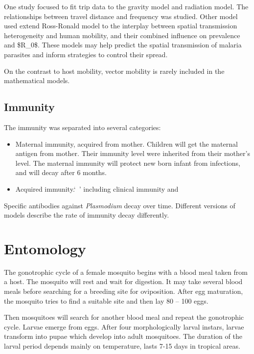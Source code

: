 \documentclass[a4paper, 12pt, twoside]{article}
\begin{document}
  One study focused to fit trip data to the gravity model and radiation model\cite{Marshall2018}.
  The relationships between travel distance and frequency was studied.
  Other model\cite{acevedo_spatial_2015} used extend Ross-Ronald model to the interplay between spatial transmission heterogeneity and human mobility, and their combined influence on prevalence and \gls{$R_0$}.
  These models may help predict the spatial transmission of malaria parasites and inform strategies to control their spread.

  On the contrast to host mobility, vector mobility is rarely included in the mathematical models.

\subsection{Immunity}

The immunity was separated into several categories:

\begin{itemize}
  \item Maternal immunity, acquired from mother. Children will get the maternal antigen from mother. Their immunity level were inherited from their mother's level. The maternal immunity will protect new born infant from infections, and will decay after 6 months.
  \item Acquired immunity.`\ ' including clinical immunity and  
\end{itemize}

Specific antibodies against \textit{Plasmodium} decay over time.
Different versions of models describe the rate of immunity decay differently.


\section{Entomology}

The gonotrophic cycle of a female mosquito begins with a blood meal taken from a host.
The mosquito will rest and wait for digestion.
It may take several blood meals before searching for a breeding site for oviposition.
After egg maturation, the mosquito tries to find a suitable site and then lay 80 – 100 eggs.

Then mosquitoes will search for another blood meal and repeat the gonotrophic cycle.
Larvae emerge from eggs.
After four morphologically larval instars, larvae transform into pupae which develop into adult mosquitoes.
The duration of the larval period depends mainly on temperature, lasts 7-15 days in tropical areas.
\end{document}
